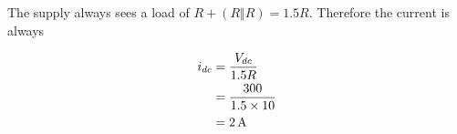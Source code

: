 \subsection{}


The supply always sees a load of $R + (R\Vert R)=1.5R$. Therefore the current is always

\begin{align*}
i_{dc} & = \frac{V_{dc}}{1.5R} \\
       & = \frac{300}{1.5 \times 10} \\
       & = \unit[2]{A}
\end{align*}

\begin{center}
    
\end{center}